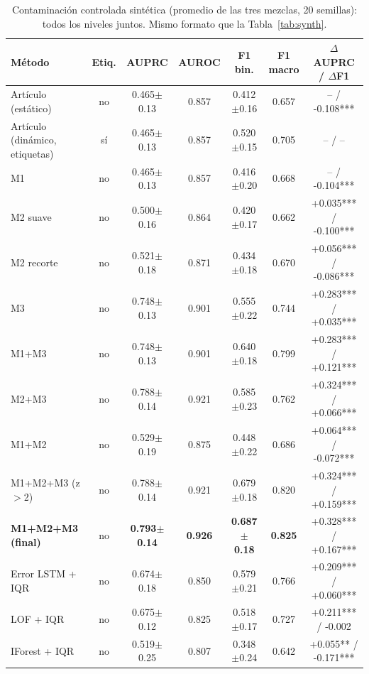 \begin{table}[t]
\centering\small
\caption{Contaminación controlada sintética (promedio de las tres mezclas, 20 semillas): todos los niveles juntos. Mismo formato que la Tabla~\ref{tab:synth}.}
\label{tab:contam_all}
\begin{tabular}{lcccccc}
\toprule
Método & Etiq. & AUPRC & AUROC & F1 bin. & F1 macro & $\Delta$AUPRC / $\Delta$F1 \\
\midrule
Artículo (estático) & no & 0.465{\scriptsize$\pm$0.13} & 0.857 & 0.412{\scriptsize$\pm$0.16} & 0.657 & -- / -0.108*** \\
Artículo (dinámico, etiquetas) & sí & 0.465{\scriptsize$\pm$0.13} & 0.857 & 0.520{\scriptsize$\pm$0.15} & 0.705 & -- / -- \\
\midrule
M1 & no & 0.465{\scriptsize$\pm$0.13} & 0.857 & 0.416{\scriptsize$\pm$0.20} & 0.668 & -- / -0.104*** \\
M2 suave & no & 0.500{\scriptsize$\pm$0.16} & 0.864 & 0.420{\scriptsize$\pm$0.17} & 0.662 & +0.035*** / -0.100*** \\
M2 recorte & no & 0.521{\scriptsize$\pm$0.18} & 0.871 & 0.434{\scriptsize$\pm$0.18} & 0.670 & +0.056*** / -0.086*** \\
M3 & no & 0.748{\scriptsize$\pm$0.13} & 0.901 & 0.555{\scriptsize$\pm$0.22} & 0.744 & +0.283*** / +0.035*** \\
M1+M3 & no & 0.748{\scriptsize$\pm$0.13} & 0.901 & 0.640{\scriptsize$\pm$0.18} & 0.799 & +0.283*** / +0.121*** \\
M2+M3 & no & 0.788{\scriptsize$\pm$0.14} & 0.921 & 0.585{\scriptsize$\pm$0.23} & 0.762 & +0.324*** / +0.066*** \\
M1+M2 & no & 0.529{\scriptsize$\pm$0.19} & 0.875 & 0.448{\scriptsize$\pm$0.22} & 0.686 & +0.064*** / -0.072*** \\
\midrule
M1+M2+M3 (z$>$2) & no & 0.788{\scriptsize$\pm$0.14} & 0.921 & 0.679{\scriptsize$\pm$0.18} & 0.820 & +0.324*** / +0.159*** \\
\textbf{M1+M2+M3 (final)} & no & \textbf{0.793{\scriptsize$\pm$0.14}} & \textbf{0.926} & \textbf{0.687{\scriptsize$\pm$0.18}} & \textbf{0.825} & +0.328*** / +0.167*** \\
\midrule
Error LSTM + IQR & no & 0.674{\scriptsize$\pm$0.18} & 0.850 & 0.579{\scriptsize$\pm$0.21} & 0.766 & +0.209*** / +0.060*** \\
LOF + IQR & no & 0.675{\scriptsize$\pm$0.12} & 0.825 & 0.518{\scriptsize$\pm$0.17} & 0.727 & +0.211*** / -0.002 \\
IForest + IQR & no & 0.519{\scriptsize$\pm$0.25} & 0.807 & 0.348{\scriptsize$\pm$0.24} & 0.642 & +0.055** / -0.171*** \\
\bottomrule
\end{tabular}
\end{table}
